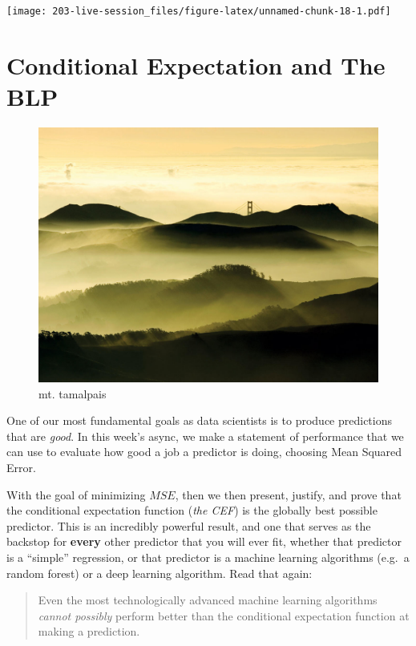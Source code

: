 \documentclass[
]{book}
\theoremstyle{definition}
\theoremstyle{definition}
\theoremstyle{definition}
\theoremstyle{definition}
\theoremstyle{remark}
\begin{document}
\texttt{[image: 203-live-session\_files/figure-latex/unnamed-chunk-18-1.pdf]}

\hypertarget{conditional-expectation-and-the-blp}{%
\chapter{Conditional Expectation and The BLP}\label{conditional-expectation-and-the-blp}}

\begin{figure}
\centering
\includegraphics{./images/tam-view.jpeg}
\caption{mt. tamalpais}
\end{figure}

One of our most fundamental goals as data scientists is to produce predictions that are \emph{good}. In this week's async, we make a statement of performance that we can use to evaluate how good a job a predictor is doing, choosing Mean Squared Error.

With the goal of minimizing \(MSE\), then we then present, justify, and prove that the conditional expectation function (\emph{the CEF}) is the globally best possible predictor. This is an incredibly powerful result, and one that serves as the backstop for \textbf{every} other predictor that you will ever fit, whether that predictor is a ``simple'' regression, or that predictor is a machine learning algorithms (e.g.~a random forest) or a deep learning algorithm. Read that again:

\begin{quote}
Even the most technologically advanced machine learning algorithms \emph{cannot possibly} perform better than the conditional expectation function at making a prediction.
\end{quote}
\end{document}
